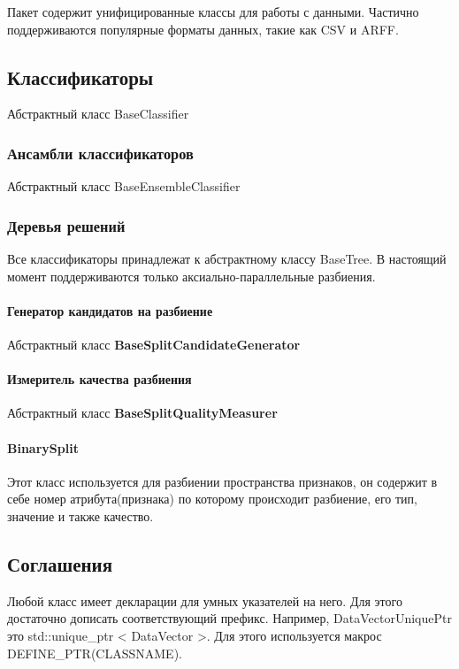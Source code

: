 Пакет содержит унифицированные классы для работы с данными. Частично поддерживаются популярные форматы данных, такие как C\-S\-V и A\-R\-F\-F.

\subsection*{Классификаторы}

Абстрактный класс Base\-Classifier

\subsubsection*{Ансамбли классификаторов}

Абстрактный класс Base\-Ensemble\-Classifier

\subsubsection*{Деревья решений}

Все классификаторы принадлежат к абстрактному классу Base\-Tree. В настоящий момент поддерживаются только аксиально-\/параллельные разбиения.

\paragraph*{Генератор кандидатов на разбиение}

Абстрактный класс {\bfseries Base\-Split\-Candidate\-Generator}

\paragraph*{Измеритель качества разбиения}

Абстрактный класс {\bfseries Base\-Split\-Quality\-Measurer}

\paragraph*{Binary\-Split}

Этот класс используется для разбиении пространства признаков, он содержит в себе номер атрибута(признака) по которому происходит разбиение, его тип, значение и также качество.

\subsection*{Соглашения}

\begin{DoxyVerb}Любой класс имеет декларации для умных указателей на него. Для этого достаточно дописать соответствующий префикс.
Например, DataVectorUniquePtr это std::unique_ptr < DataVector >.
Для этого используется макрос DEFINE_PTR(CLASSNAME).\end{DoxyVerb}
 